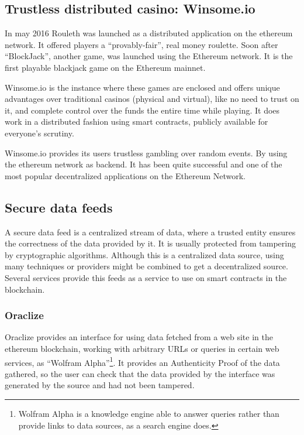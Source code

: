 \subsection{Trustless distributed casino: Winsome.io}

In may 2016 Rouleth \cite{winsomeio} was launched as a distributed application
  on the ethereum network.
It offered players a ``provably-fair'', real money roulette.
Soon after ``BlockJack'', another game,  was launched using the Ethereum
  network.
It is the first playable blackjack game on the Ethereum mainnet.

Winsome.io is the instance where these games are enclosed and offers unique
  advantages over traditional casinos (physical and virtual), like no need to
  trust on it, and complete control over the funds the entire time while
  playing.
It does work in a distributed fashion using smart contracts, publicly available
  for everyone's scrutiny.

Winsome.io provides its users trustless gambling over random events.
By using the ethereum network as backend.
It has been quite successful and one of the most popular decentralized
  applications on the Ethereum Network.

\subsection{Secure data feeds}
A secure data feed is a centralized stream of data, where a trusted entity
  ensures the correctness of the data provided by it.
It is usually protected from tampering by cryptographic algorithms.
Although this is a centralized data source, using many techniques or providers
  might be combined to get a decentralized source.
Several services provide this feeds as a service to use on smart contracts in
  the blockchain.

\subsubsection{Oraclize}
Oraclize \cite{oraclizeit} provides an interface for using data fetched from a
  web site in the ethereum blockchain, working with arbitrary URLs or queries
  in certain web services, as ``Wolfram Alpha''\footnote{Wolfram Alpha is a
  knowledge engine able to answer queries rather than provide links to data
  sources, as a search engine does.}.
It provides an Authenticity Proof of the data gathered, so the user can check
  that the data provided by the interface was generated by the source and had
  not been tampered.

